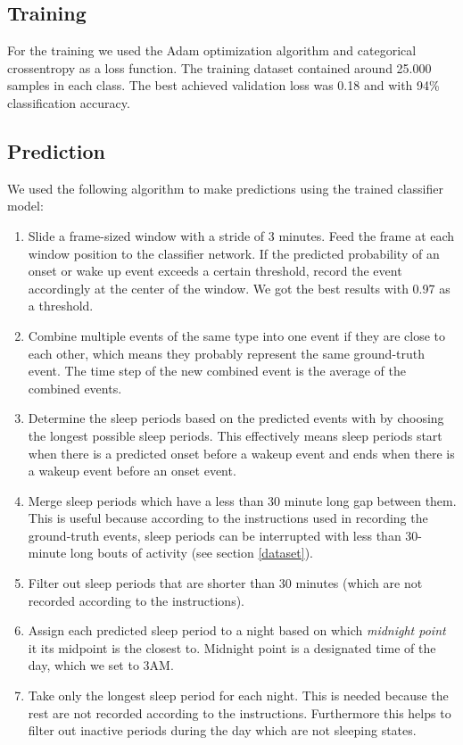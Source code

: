 \documentclass{article}
\begin{document}
\subsection{Training}

For the training we used the Adam optimization algorithm and categorical crossentropy as a loss function. The training dataset contained around 25.000 samples in each class. The best achieved validation loss was 0.18 and with 94\% classification accuracy.

\subsection{Prediction}

We used the following algorithm to make predictions using the trained classifier model:
\begin{enumerate}
    \item Slide a frame-sized window with a stride of 3 minutes. Feed the frame at each window position to the classifier network. If the predicted probability of an onset or wake up event exceeds a certain threshold, record the event accordingly at the center of the window. We got the best results with 0.97 as a threshold.
    \item Combine multiple events of the same type into one event if they are close to each other, which means they probably represent the same ground-truth event. The time step of the new combined event is the average of the combined events.
    \item Determine the sleep periods based on the predicted events with by choosing the longest possible sleep periods. This effectively means sleep periods start when there is a predicted onset before a wakeup event and ends when there is a wakeup event before an onset event.
    \item Merge sleep periods which have a less than 30 minute long gap between them. This is useful because according to the instructions used in recording the ground-truth events, sleep periods can be interrupted with less than 30-minute long bouts of activity (see section \ref{dataset}).
    \item Filter out sleep periods that are shorter than 30 minutes (which are not recorded according to the instructions).
    \item Assign each predicted sleep period to a night based on which \textit{midnight point} it its midpoint is the closest to. Midnight point is a designated time of the day, which we set to 3AM.
    \item Take only the longest sleep period for each night. This is needed because the rest are not recorded according to the instructions. Furthermore this helps to filter out inactive periods during the day which are not sleeping states.
\end{enumerate}
\end{document}
